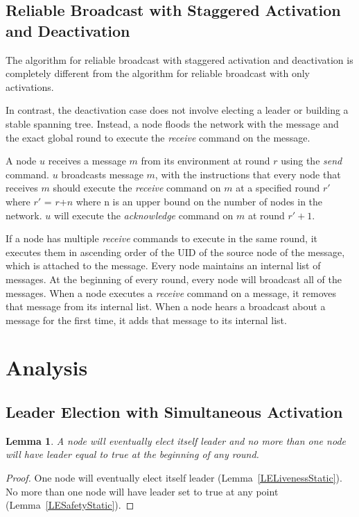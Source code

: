 \documentclass[english]{article}
\newtheorem{lemma}[theorem]{Lemma}
\begin{document}
  \subsection {Reliable Broadcast with Staggered Activation and Deactivation}

The algorithm for reliable broadcast with staggered activation and deactivation is completely different from the algorithm for reliable broadcast with only activations. 


In contrast, the deactivation case does not involve electing a leader or building a stable spanning tree. Instead, a node floods the network with the message and the exact global round to execute the \textit{receive} command on the message.


A node $u$ receives a message $m$ from its environment at round $r$ using the \textit{send} command. $u$ broadcasts message $m$, with the instructions that every node that receives $m$ should execute the \textit{receive} command on $m$ at a specified round $r'$ where $r'$ = $r$+$n$ where n is an upper bound on the number of nodes in the network. $u$ will execute the \textit{acknowledge} command on $m$ at round $r' + 1$.

If a node has multiple \textit{receive} commands to execute in the same round, it executes them in ascending order of the UID of the source node of the message, which is attached to the message. Every node maintains an internal list of messages. At the beginning of every round, every node will broadcast all of the messages. When a node executes a \textit{receive} command on a message, it removes that message from its internal list.  When a node hears a broadcast about a message for the first time, it adds that message to its internal list.


\section{Analysis}

\subsection{Leader Election with Simultaneous Activation}

\begin{lemma}
\label{LeaderElectionStatic}
A node will eventually elect itself leader and no more than one node will have leader equal to true at the beginning of any round. 
\end{lemma}
\begin{proof}
One node will eventually elect itself leader (Lemma~\ref{LELivenessStatic}).
No more than one node will have leader set to true at any point (Lemma~\ref{LESafetyStatic}).
\end{proof}
\end{document}
